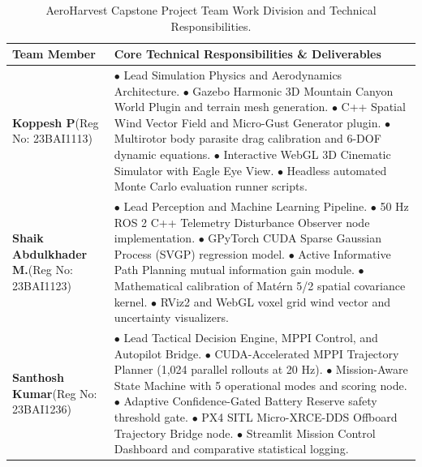 \documentclass[12pt,a4paper,oneside]{report}
\begin{document}
\begin{table}[H]
    \centering
    \small
    \caption{AeroHarvest Capstone Project Team Work Division and Technical Responsibilities.}
    \label{tab:team_roles}
    \begin{tabularx}{\linewidth}{p{4.2cm}X}
        \toprule
        \textbf{Team Member} & \textbf{Core Technical Responsibilities \& Deliverables} \\
        \midrule
        \textbf{Koppesh P}\newline(Reg No: 23BAI1113) & 
        $\bullet$ Lead Simulation Physics and Aerodynamics Architecture.\newline
        $\bullet$ Gazebo Harmonic 3D Mountain Canyon World Plugin and terrain mesh generation.\newline
        $\bullet$ C++ Spatial Wind Vector Field and Micro-Gust Generator plugin.\newline
        $\bullet$ Multirotor body parasite drag calibration and 6-DOF dynamic equations.\newline
        $\bullet$ Interactive WebGL 3D Cinematic Simulator with Eagle Eye View.\newline
        $\bullet$ Headless automated Monte Carlo evaluation runner scripts. \\
        \midrule
        \textbf{Shaik Abdulkhader M.}\newline(Reg No: 23BAI1123) & 
        $\bullet$ Lead Perception and Machine Learning Pipeline.\newline
        $\bullet$ 50 Hz ROS 2 C++ Telemetry Disturbance Observer node implementation.\newline
        $\bullet$ GPyTorch CUDA Sparse Gaussian Process (SVGP) regression model.\newline
        $\bullet$ Active Informative Path Planning mutual information gain module.\newline
        $\bullet$ Mathematical calibration of Mat\'ern 5/2 spatial covariance kernel.\newline
        $\bullet$ RViz2 and WebGL voxel grid wind vector and uncertainty visualizers. \\
        \midrule
        \textbf{Santhosh Kumar}\newline(Reg No: 23BAI1236) & 
        $\bullet$ Lead Tactical Decision Engine, MPPI Control, and Autopilot Bridge.\newline
        $\bullet$ CUDA-Accelerated MPPI Trajectory Planner (1,024 parallel rollouts at 20 Hz).\newline
        $\bullet$ Mission-Aware State Machine with 5 operational modes and scoring node.\newline
        $\bullet$ Adaptive Confidence-Gated Battery Reserve safety threshold gate.\newline
        $\bullet$ PX4 SITL Micro-XRCE-DDS Offboard Trajectory Bridge node.\newline
        $\bullet$ Streamlit Mission Control Dashboard and comparative statistical logging. \\
        \bottomrule
    \end{tabularx}
\end{table}
\end{document}

